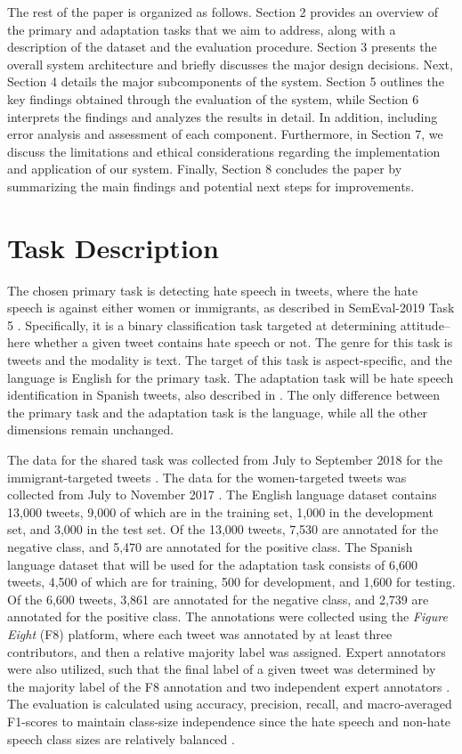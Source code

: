 \documentclass[11pt,a4paper]{article}
\begin{document}
    The rest of the paper is organized as follows. Section 2 provides an overview of the primary and adaptation tasks that we aim to address, along with a description of the dataset and the evaluation procedure. Section 3 presents the overall system architecture and briefly discusses the major design decisions. Next, Section 4 details the major subcomponents of the system. Section 5 outlines the key findings obtained through the evaluation of the system, while Section 6 interprets the findings and analyzes the results in detail. In addition, including error analysis and assessment of each component. Furthermore, in Section 7, we discuss the limitations and ethical considerations regarding the implementation and application of our system. Finally, Section 8 concludes the paper by summarizing the main findings and potential next steps for improvements.


\section{Task Description}
    The chosen primary task is detecting hate speech in tweets, where the hate speech is against either women or immigrants, as described in SemEval-2019 Task 5 \citep{basile-etal-2019-semeval}. Specifically, it is a binary classification task targeted at determining attitude–here whether a given tweet contains hate speech or not. The genre for this task is tweets and the modality is text. The target of this task is aspect-specific, and the language is English for the primary task. The adaptation task will be hate speech identification in Spanish tweets, also described in \citet{basile-etal-2019-semeval}. The only difference between the primary task and the adaptation task is the language, while all the other dimensions remain unchanged.

   The data for the shared task was collected from July to September 2018 for the immigrant-targeted tweets \citep{basile-etal-2019-semeval}. The data for the women-targeted tweets was collected from July to November 2017 \citep{fersini2018overview}. The English language dataset contains 13,000 tweets, 9,000 of which are in the training set, 1,000 in the development set, and 3,000 in the test set. Of the 13,000 tweets, 7,530 are annotated for the negative class, and 5,470 are annotated for the positive class. The Spanish language dataset that will be used for the adaptation task consists of 6,600 tweets, 4,500 of which are for training, 500 for development, and 1,600 for testing. Of the 6,600 tweets, 3,861 are annotated for the negative class, and 2,739 are annotated for the positive class. The annotations were collected using the \textit{Figure Eight} (F8) platform, where each tweet was annotated by at least three contributors, and then a relative majority label was assigned. Expert annotators were also utilized, such that the final label of a given tweet was determined by the majority label of the F8 annotation and two independent expert annotators \citep{basile-etal-2019-semeval}. The evaluation is calculated using accuracy, precision, recall, and macro-averaged F1-scores to maintain class-size independence since the hate speech and non-hate speech class sizes are relatively balanced \citep{basile-etal-2019-semeval}.
   
\end{document}
